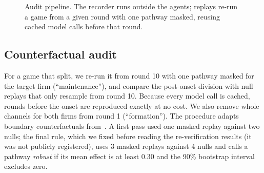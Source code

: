 \documentclass[11pt]{article}
\begin{document}
\begin{figure}[t]
\centering
{}
\caption{Audit pipeline. The recorder runs outside the agents; replays re-run a game from a given round with
one pathway masked, reusing cached model calls before that round.}
\label{fig:pipeline}
\end{figure}

\subsection*{Counterfactual audit}
For a game that split, we re-run it from round 10 with one pathway masked for the target firm (``maintenance''),
and compare the post-onset division with null replays that only resample from round 10. Because every model call
is cached, rounds before the onset are reproduced exactly at no cost. We also remove whole channels for both firms
from round 1 (``formation''). The procedure adapts boundary counterfactuals from~\citep{zhang2026agentsentry}. A first
pass used one masked replay against two nulls; the final rule, which we fixed before reading the re-verification results (it was not publicly registered), uses 3 masked
replays against 4 nulls and calls a pathway \emph{robust} if its mean effect is at least 0.30 and the 90\%
bootstrap interval excludes zero.
\end{document}
